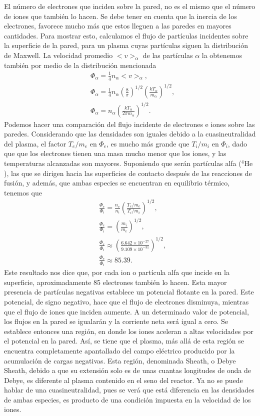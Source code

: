 \documentclass[../main.tex]{subfiles}
\begin{document}
	El número de electrones que inciden sobre la pared, no es el mismo que el número de iones que también lo hacen. Se debe tener en cuenta que la inercia de los electrones, favorece mucho más que estos lleguen a las paredes en mayores cantidades. Para mostrar esto, calculamos el flujo de partículas incidentes sobre la superficie de la pared, para un plasma cuyas partículas siguen la distribución de Maxwell. La velocidad promedio $<v>_{\alpha}$ de las partículas $\alpha$ la obtenemos también por medio de la distribución mencionada
        \begin{align}
            &\Phi_{\alpha} = \frac{1}{4}n_{\alpha}<v>_{\alpha}, \\
            &\Phi_{\alpha} =  \frac{1}{4}n_{\alpha}\left( \frac{8}{\pi} \right)^{1/2} \left( \frac{kT_{\alpha}}{m_{\alpha}} \right)^{1/2}, \\
            &\Phi_{\alpha} = n_{\alpha} \left( \frac{kT_{\alpha}}{2\pi m_{\alpha}} \right)^{1/2}.
        \end{align}
    Podemos hacer una comparación del flujo incidente de electrones e iones sobre las paredes. Considerando que las densidades son iguales debido a la cuasineutralidad del plasma, el factor $T_e/m_e$ en $\Phi_e$, es mucho más grande que $T_i/m_i$ en $\Phi_i$, dado que que los electrones tienen una masa mucho menor que los iones, y las temperaturas alcanzadas son mayores. Suponiendo que serán partículas alfa ($\mathrm{^4He}$), las que se dirigen hacia las superficies de contacto después de las reacciones de fusión, y además, que ambas especies se encuentran en equilibrio térmico, tenemos que
        \begin{align}
          &\frac{\Phi_{e}}{\Phi_{i}} = \frac{n_{e}}{n_{i}} \left( \frac{T_{e}/m_{e}}{T_{i}/m_{i}} \right)^{1/2}, \\
          &\frac{\Phi_{e}}{\Phi_{i}} = \left(\frac{m_{i}}{m_{e}} \right)^{1/2}, \\
          &\frac{\Phi_{e}}{\Phi_{i}} \approx \left( \frac{6.642 \times 10^{-27}}{9.109 \times 10^{-31}} \right)^{1/2}, \\
          &\frac{\Phi_{e}}{\Phi_{i}} \approx 85.39.
        \end{align}
    Este resultado nos dice que, por cada ion o partícula alfa que incide en la superficie, aproximadamente 85 electrones también lo hacen. Esta mayor presencia de partículas negativas establece un potencial flotante en la pared. Este potencial, de signo negativo, hace que el flujo de electrones disminuya, mientras que el flujo de iones que inciden aumente. A un determinado valor de potencial, los flujos en la pared se igualarán y la corriente neta será igual a cero. Se establece entonces una región, en donde los iones aceleran a altas velocidades por el potencial en la pared. Así, se tiene que el plasma, más allá de esta región se encuentra completamente apantallado del campo eléctrico producido por la acumulación de cargas negativas. Esta región, denominada Sheath, o Debye Sheath, debido a que su extensión solo es de unas cuantas longitudes de onda de Debye, es diferente al plasma contenido en el seno del reactor. Ya no se puede hablar de una cuasineutralidad, pues se verá que está diferencia en las densidades de ambas especies, es producto de una condición impuesta en la velocidad de los iones.
\end{document}
